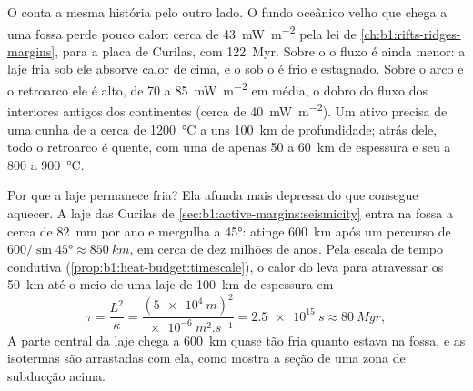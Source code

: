 \begin{omfigure}
\par{}
\label{fig:b1:active-margins:profiles}
\end{omfigure}

O  conta a mesma história pelo outro lado. O fundo oceânico velho que chega a uma fossa perde pouco calor: cerca de \qty{43}{mW.m^{-2}} pela lei de \cref{ch:b1:rifts-ridges-margins}, para a placa de Curilas, com \qty{122}{Myr}. Sobre o  o fluxo é ainda menor: a laje fria sob ele absorve calor de cima, e o  sob o  é frio e estagnado. Sobre o arco e o retroarco ele é alto, de 70 a \qty{85}{mW.m^{-2}} em média, o dobro do fluxo dos interiores antigos dos continentes (cerca de \qty{40}{mW.m^{-2}}). Um  ativo precisa de uma cunha de  a cerca de \qty{1200}{\celsius} a uns \qty{100}{km} de profundidade; atrás dele, todo o retroarco é quente, com uma  de apenas 50 a \qty{60}{km} de espessura e seu  a 800 a \qty{900}{\celsius}.

Por que a laje permanece fria? Ela afunda mais depressa do que consegue aquecer. A laje das Curilas de \cref{sec:b1:active-margins:seismicity} entra na fossa a cerca de \qty{82}{mm} por ano e mergulha a \ang{45}: atinge \qty{600}{km} após um percurso de $600/\sin\ang{45} \approx \qty{850}{km}$, em cerca de dez milhões de anos. Pela escala de tempo condutiva (\cref{prop:b1:heat-budget:timescale}), o calor do  leva para atravessar os \qty{50}{km} até o meio de uma laje de \qty{100}{km} de espessura em
\[
  \tau = \frac{L^2}{\kappa} = \frac{(\qty{5e4}{m})^2}{\qty{e-6}{m^2.s^{-1}}}
  = \qty{2.5e15}{s} \approx \qty{80}{Myr},
\]
A parte central da laje chega a \qty{600}{km} quase tão fria quanto estava na fossa, e as isotermas são arrastadas com ela, como mostra a seção de uma zona de subducção acima.


